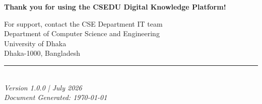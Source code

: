 \documentclass[12pt,a4paper]{article}
\begin{document}
\vspace{1cm}

\begin{center}
\Large
\textbf{Thank you for using the CSEDU Digital Knowledge Platform!}
\end{center}

\vspace{0.5cm}

\begin{center}
For support, contact the CSE Department IT team\\
Department of Computer Science and Engineering\\
University of Dhaka\\
Dhaka-1000, Bangladesh
\end{center}

\vspace{1cm}

\begin{center}
\rule{0.5\textwidth}{0.4pt}\\
\vspace{0.3cm}
\textit{Version 1.0.0 | July 2026}\\
\textit{Document Generated: \today}
\end{center}
\end{document}
